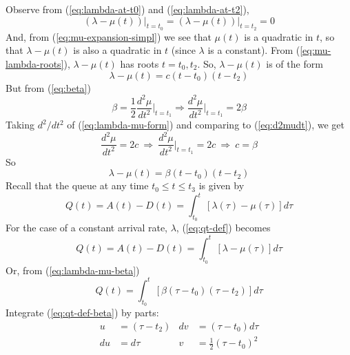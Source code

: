 \documentclass[12pt]{report}
\begin{document}
Observe from (\ref{eq:lambda-at-t0}) and (\ref{eq:lambda-at-t2}),
\begin{equation}
  \label{eq:mu-lambda-roots}
  (\lambda - \mu(t))\rvert_{t=t_0} = (\lambda - \mu(t))\rvert_{t=t_2} = 0
\end{equation}
And, from (\ref{eq:mu-expansion-simpl}) we see that $\mu(t)$ is a quadratic in $t$,
so that $\lambda-\mu(t)$ is also a quadratic in $t$ (since $\lambda$
is a constant).  From (\ref{eq:mu-lambda-roots}), $\lambda - \mu(t)$ has
roots $t=t_0,t_2$.  So, $\lambda - \mu(t)$ is of the form
\begin{equation}
  \label{eq:lambda-mu-form}
  \lambda-\mu(t) = c(t-t_0)(t-t_2)
\end{equation}
But from (\ref{eq:beta})
\begin{equation}
  \label{eq:d2mudt}
  \beta = \frac{1}{2}\frac{d^2\mu}{dt^2}\Biggr\rvert_{t=t_1}
  \Rightarrow \frac{d^2\mu}{dt^2}\Biggr\rvert_{t=t_1} = 2\beta
\end{equation}
Taking ${d^2}/{dt^2}$ of (\ref{eq:lambda-mu-form}) and comparing
to (\ref{eq:d2mudt}), we get
\begin{equation*}
  \frac{d^2\mu}{dt^2} = 2c \:\Rightarrow\:
  \frac{d^2\mu}{dt^2}\Biggr\rvert_{t=t_1}=2c \:\Rightarrow\: c = \beta
\end{equation*}
So
\begin{equation}
  \label{eq:lambda-mu-beta}
  \lambda - \mu(t) = \beta(t-t_0)(t-t_2)
\end{equation}
Recall that the queue at any time $t_0 \le t \le t_3$  is given by
\begin{equation}
  \label{eq:qt-def}
  Q(t)=A(t)-D(t)=\int_{t_0}^t\left[\lambda(\tau)-\mu(\tau)\right]d\tau
\end{equation}
For the case of a constant arrival rate, $\lambda$, (\ref{eq:qt-def})
becomes
\begin{equation}
  \label{eq:qt-def-2}
  Q(t)=A(t)-D(t)=\int_{t_0}^t\left[\lambda-\mu(\tau)\right]d\tau
\end{equation}
Or, from (\ref{eq:lambda-mu-beta})
\begin{equation}
  \label{eq:qt-def-beta}
  Q(t)=\int_{t_0}^t\left[\beta(\tau-t_0)(\tau-t_2)\right]d\tau
\end{equation}
Integrate (\ref{eq:qt-def-beta}) by parts:
\begin{align*}
  u & = (\tau-t_2) & dv & = (\tau-t_0)d\tau\\
  du & = d\tau & v & = \frac{1}{2}(\tau - t_0)^2
\end{align*}
\end{document}
